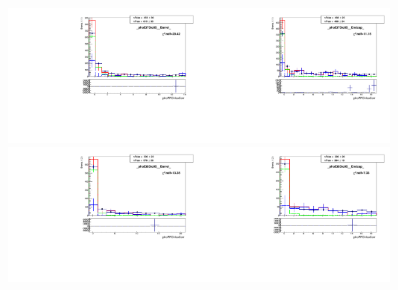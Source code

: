 \begin{figure}[htb]
  \begin{center}
   \includegraphics[width=0.45\textwidth]{../figs/figs_v11/MUON_WGamma/TemplateFits/c_TEMPL_CHISO_UNblind__phoEt75to85__Barrel__RooFit.pdf}\includegraphics[width=0.45\textwidth]{../figs/figs_v11/MUON_WGamma/TemplateFits/c_TEMPL_CHISO_UNblind__phoEt75to85__Endcap__RooFit.pdf}\\
   \includegraphics[width=0.45\textwidth]{../figs/figs_v11/MUON_WGamma/TemplateFits/c_TEMPL_CHISO_UNblind__phoEt85to95__Barrel__RooFit.pdf}\includegraphics[width=0.45\textwidth]{../figs/figs_v11/MUON_WGamma/TemplateFits/c_TEMPL_CHISO_UNblind__phoEt85to95__Endcap__RooFit.pdf}\\

\end{center}
\end{figure}
